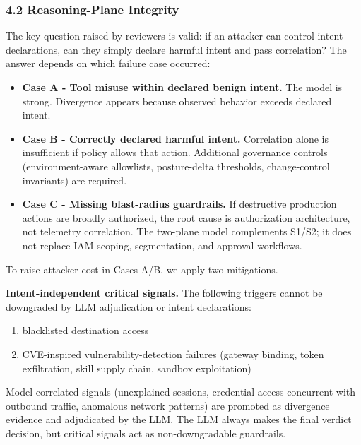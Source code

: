 \documentclass[
]{article}
\providecommand{\tightlist}{%
  \setlength{\itemsep}{0pt}\setlength{\parskip}{0pt}}
\begin{document}
\subsubsection{4.2 Reasoning-Plane
Integrity}\label{reasoning-plane-integrity}

The key question raised by reviewers is valid: if an attacker can
control intent declarations, can they simply declare harmful intent and
pass correlation? The answer depends on which failure case occurred:

\begin{itemize}
\tightlist
\item
  \textbf{Case A - Tool misuse within declared benign intent.} The model
  is strong. Divergence appears because observed behavior exceeds
  declared intent.
\item
  \textbf{Case B - Correctly declared harmful intent.} Correlation alone
  is insufficient if policy allows that action. Additional governance
  controls (environment-aware allowlists, posture-delta thresholds,
  change-control invariants) are required.
\item
  \textbf{Case C - Missing blast-radius guardrails.} If destructive
  production actions are broadly authorized, the root cause is
  authorization architecture, not telemetry correlation. The two-plane
  model complements S1/S2; it does not replace IAM scoping,
  segmentation, and approval workflows.
\end{itemize}

To raise attacker cost in Cases A/B, we apply two mitigations.

\textbf{Intent-independent critical signals.} The following triggers
cannot be downgraded by LLM adjudication or intent declarations:

\begin{enumerate}
\def\labelenumi{\arabic{enumi}.}
\tightlist
\item
  blacklisted destination access
\item
  CVE-inspired vulnerability-detection failures (gateway binding, token
  exfiltration, skill supply chain, sandbox exploitation)
\end{enumerate}

Model-correlated signals (unexplained sessions, credential access
concurrent with outbound traffic, anomalous network patterns) are
promoted as divergence evidence and adjudicated by the LLM. The LLM
always makes the final verdict decision, but critical signals act as
non-downgradable guardrails.
\end{document}
